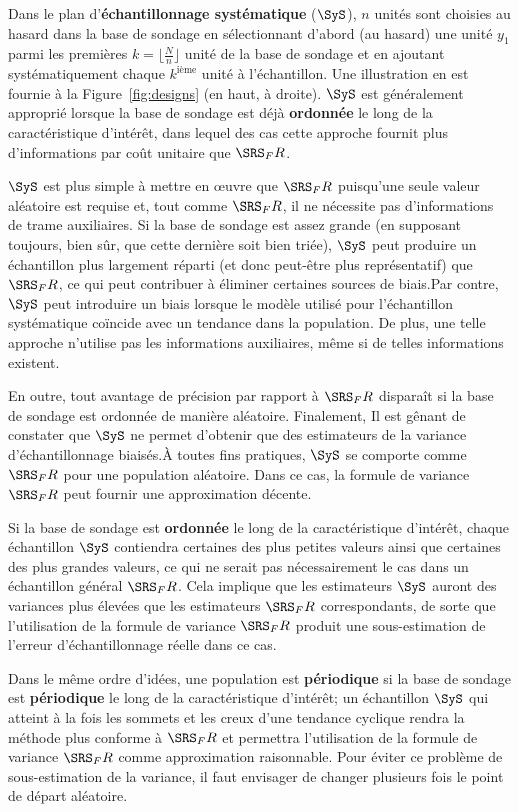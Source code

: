 Dans le plan d'\textbf{\'echantillonnage systématique} ($\SyS$), $n$ unités sont choisies au hasard dans la base de sondage en sélectionnant d'abord (au hasard) une unité $y_1$ parmi les premières $k=\lfloor\frac{N}{n}\rfloor$ unit\'e de la base de sondage et en ajoutant systématiquement chaque $k^{\textrm{i\`eme}}$ unit\'e à l'échantil\-lon. Une illustration en est fournie \`a la Figure~\ref{fig:designs} (en haut, à droite). \newl $\SyS$ est généralement approprié lorsque la base de sondage est déjà \textbf{ordonn\'ee} le long de la caractéristique d'intérêt, dans lequel des cas cette approche fournit plus d'infor\-ma\-tions par coût unitaire que $\SRS_FR$. \par $\SyS$ est plus simple à mettre en œuvre que $\SRS_FR$ puisqu'une seule valeur aléatoire est requise et, tout comme $\SRS_FR$, il ne nécessite pas d'informations de trame auxiliaires. Si la base de sondage est assez grande (en supposant toujours, bien s\^ur, que cette derni\`ere soit bien tri\'ee), $\SyS$ peut produire un échantillon plus largement réparti (et donc peut-être plus représentatif) que $\SRS_FR$, ce qui peut contribuer à éliminer certaines sources de biais.\newl Par contre, $\SyS$ peut introduire un biais lorsque le modèle utilisé pour l'échantillon systématique coïncide avec un tendance dans la population. De plus, une telle approche n'utilise pas les informations auxiliaires, même si de telles informations existent. \par En outre, tout avantage de précision par rapport à $\SRS_FR$ disparaît si la base de sondage est ordonnée de manière aléatoire. Finalement, Il est gênant de constater que $\SyS$ ne permet d'obtenir que des estimateurs de la variance d'échantillonnage biais\'es.\newpage\noindent \`A toutes fins pratiques, $\SyS$ se comporte comme $\SRS_FR$ pour une population aléatoire. Dans ce cas, la formule de variance $\SRS_FR$ peut fournir une approximation décente. 
\par Si la base de sondage est \textbf{ordonnée} le long de la caractéristique d'intérêt, chaque échantillon $\SyS$ contiendra certaines des plus petites valeurs ainsi que certaines des plus grandes valeurs, ce qui ne serait pas nécessairement le cas dans un échantillon général $\SRS_FR$. Cela implique que les estimateurs $\SyS$ auront des variances plus \'elev\'ees que les estimateurs $\SRS_FR$ correspondants, de sorte que l'utilisation de la formule de variance $\SRS_FR$ produit une sous-estimation de l'erreur d'échantillonnage réelle dans ce cas. \par Dans le même ordre d'idées, une population est \textbf{périodique} si la base de sondage est \textbf{périodique} le long de la caractéristique d'intérêt; un échantillon $\SyS$ qui atteint à la fois les sommets et les creux d'une tendance cyclique rendra la méthode plus conforme à $\SRS_FR$ et permettra l'utilisation de la formule de variance $\SRS_FR$ comme approximation raison\-na\-ble. Pour éviter ce problème de sous-estimation de la variance, il faut envisager de changer plusieurs fois le point de départ aléatoire.\newl 
